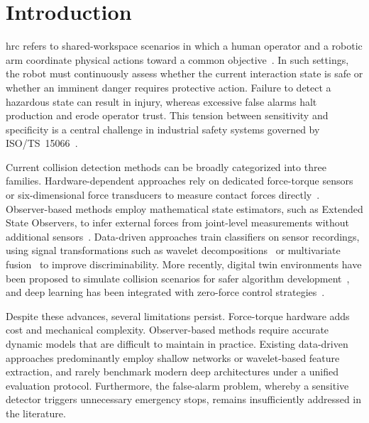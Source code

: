 \documentclass[3p,times,procedia]{elsarticle}
\begin{document}
\newpage

\section{Introduction}
\label{sec:introduction}

\Ac{hrc} refers to shared-workspace scenarios in which a human operator and a robotic arm coordinate physical actions toward a common objective~\cite{selvaggio2021autonomy}. In such settings, the robot must continuously assess whether the current interaction state is safe or whether an imminent danger requires protective action. Failure to detect a hazardous state can result in injury, whereas excessive false alarms halt production and erode operator trust. This tension between sensitivity and specificity is a central challenge in industrial safety systems governed by ISO/TS~15066~\cite{iso15066}.

Current collision detection methods can be broadly categorized into three families. Hardware-dependent approaches rely on dedicated force-torque sensors or six-dimensional force transducers to measure contact forces directly~\cite{wang2025sixdof}. Observer-based methods employ mathematical state estimators, such as Extended State Observers, to infer external forces from joint-level measurements without additional sensors~\cite{tonti2024eso}. Data-driven approaches train classifiers on sensor recordings, using signal transformations such as wavelet decompositions~\cite{niu2024wavelet} or multivariate fusion~\cite{fang2024multivariate} to improve discriminability. More recently, digital twin environments have been proposed to simulate collision scenarios for safer algorithm development~\cite{an2024digitaltwin}, and deep learning has been integrated with zero-force control strategies~\cite{zhao2025zeroforce}.

Despite these advances, several limitations persist. Force-torque hardware adds cost and mechanical complexity. Observer-based methods require accurate dynamic models that are difficult to maintain in practice. Existing data-driven approaches predominantly employ shallow networks or wavelet-based feature extraction, and rarely benchmark modern deep architectures under a unified evaluation protocol. Furthermore, the false-alarm problem, whereby a sensitive detector triggers unnecessary emergency stops, remains insufficiently addressed in the literature.
\end{document}
